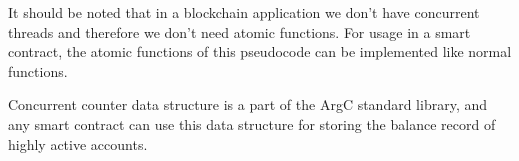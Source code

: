 It should be noted that in a blockchain application we don't have concurrent threads and therefore we don't need
atomic functions. For usage in a smart contract, the atomic functions of this pseudocode can be implemented like
normal functions.

Concurrent counter data structure is a part of the ArgC standard library, and any smart contract can use this data
structure for storing the balance record of highly active accounts.
